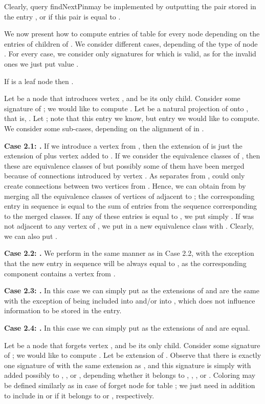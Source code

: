 \documentclass[a4paper,11pt]{article}
\theoremstyle{definition}
\theoremstyle{remark}
\newcommand{\qpin}{\textnormal{findNextPin}}
\begin{document}
Clearly, query \qpin may be implemented by outputting the pair 
stored in the entry
, or  if this
pair is equal to .

We now present how to compute entries of table  for every node
 depending on the entries of children of .  We consider
different cases, depending of the type of node .  For every case,
we consider only signatures  for which 
is valid, as for the invalid ones we just put value . 

\vskip 0.3cm
 If  is a leaf node then
.  \vskip 0.3cm

 Let  be a node that
introduces vertex , and  be its only child.  Consider some
signature  of ; we would like to compute
.  Let  be a
natural projection of  onto , that is, .  Let
; note that this
entry we know, but entry  we would like to compute.  We
consider some sub-cases, depending on the alignment of  in .

\vskip 0.1cm {\bf{Case 2.1: .}} If we introduce a
vertex from , then the extension of 
is just the extension of  plus vertex  added to
.  If we consider the equivalence classes of , then
these are equivalence classes of  but possibly some of them have
been merged because of connections introduced by vertex .  As 
separates  from ,  could only create connections between
two vertices from .  Hence, we can obtain
 from  by merging all the equivalence classes of vertices of
 adjacent to ; the corresponding entry in
sequence  is equal to the sum of entries from the
sequence  corresponding to the merged classes.  If
any of these entries is equal to , we put simply .  If 
was not adjacent to any vertex of , we put  in a
new equivalence class  with .  Clearly, we can also put
.

\vskip 0.1cm {\bf{Case 2.2: .}} We perform in the
same manner as in Case 2.2, with the exception that the new entry in
sequence  will be always equal to , as the
corresponding component contains a vertex from .

\vskip 0.1cm {\bf{Case 2.3: .}} In this case we can
simply put  as the extensions of 
and  are the same with the exception of  being included into
 and/or into , which does not influence
information to be stored in the entry.

\vskip 0.1cm

{\bf{Case 2.4: .}} In this case we can simply put
 as the extensions of  and  are equal.

\vskip 0.3cm

 Let  be a node that forgets
vertex , and  be its only child.  Consider some signature
 of ; we would like to compute
.  Let
 be extension of
.  Observe that there is exactly one signature
 of  with the same extension as ,
and this signature is simply  with  added possibly to ,
,  or , depending whether it belongs to ,
, , or .  Coloring  may be
defined similarly as in case of forget node for table ; we just
need in addition to include  in  or  if it
belongs to  or , respectively.
\end{document}
